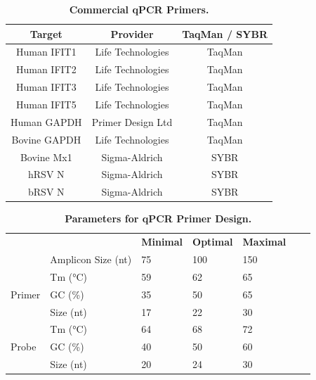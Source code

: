 \begin{table}
\centering
\begin{tabular}{ccc}
\textbf{Target} & \textbf{Provider} & \textbf{TaqMan / SYBR} \\ \hline
Human IFIT1     & Life Technologies & TaqMan                 \\ \hline
Human IFIT2     & Life Technologies & TaqMan                 \\ \hline
Human IFIT3     & Life Technologies & TaqMan                 \\ \hline
Human IFIT5     & Life Technologies & TaqMan                 \\ \hline
Human GAPDH     & Primer Design Ltd & TaqMan                 \\ \hline
Bovine GAPDH    & Life Technologies & TaqMan                 \\ \hline
Bovine Mx1      & Sigma-Aldrich     & SYBR                   \\ \hline
hRSV N          & Sigma-Aldrich     & SYBR                   \\ \hline
bRSV N          & Sigma-Aldrich     & SYBR                   \\ \hline
\end{tabular}
\caption[Commercial qPCR Primers.]{\textbf{Commercial qPCR Primers.}}
\label{Commercial qPCR Primers Table}
\end{table}


\begin{table}
\centering
\begin{tabular}{lllllll}
                        &                    & \textbf{Minimal} & \textbf{Optimal} & \textbf{Maximal} &  &  \\ \cline{3-5}
                        & Amplicon Size (nt) & 75               & 100              & 150              &  &  \\ \cline{1-5}
\multirow{3}{*}{Primer} & Tm (°C)            & 59               & 62               & 65               &  &  \\ \cline{2-5}
                        & GC (\%)            & 35               & 50               & 65               &  &  \\ \cline{2-5}
                        & Size (nt)          & 17               & 22               & 30               &  &  \\ \cline{1-5}
\multirow{3}{*}{Probe}  & Tm (°C)            & 64               & 68               & 72               &  &  \\ \cline{2-5}
                        & GC (\%)            & 40               & 50               & 60               &  &  \\ \cline{2-5}
                        & Size (nt)          & 20               & 24               & 30               &  &  \\ \cline{1-5}
\end{tabular}
\caption[Parameters for qPCR Primer Design.]{\textbf{Parameters for qPCR Primer Design.}}
\label{Parameters for qPCR Primer Design table}
\end{table}

